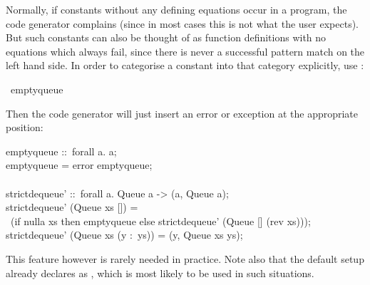 \begin{isabellebody}
\begin{isamarkuptext}
  Normally, if constants without any defining equations occur in
  a program, the code generator complains (since in most cases
  this is not what the user expects).  But such constants can also
  be thought of as function definitions with no equations which
  always fail, since there is never a successful pattern match
  on the left hand side.  In order to categorise a constant into
  that category explicitly, use \hyperlink{command.code-abort}{\mbox{}}:%
\end{isamarkuptext}%
\isamarkuptrue%
%
\isadelimquote
%
\endisadelimquote
%
\isatagquote
{}\isamarkupfalse%
\ empty{\isacharunderscore}queue%
\endisatagquote
{\isafoldquote}%
%
\isadelimquote
%
\endisadelimquote
%
\begin{isamarkuptext}%
\noindent Then the code generator will just insert an error or
  exception at the appropriate position:%
\end{isamarkuptext}%
\isamarkuptrue%
%
\isadelimquote
%
\endisadelimquote
%
\isatagquote
%
\begin{isamarkuptext}%
\isaverbatim%
\noindent%
\hspace*{0pt}empty{}queue ::~forall a. a;\\
\hspace*{0pt}empty{}queue = error {}empty{}queue{};\\
\hspace*{0pt}\\
\hspace*{0pt}strict{}dequeue' ::~forall a. Queue a -> (a, Queue a);\\
\hspace*{0pt}strict{}dequeue' (Queue xs []) =\\
\hspace*{0pt} ~(if nulla xs then empty{}queue else strict{}dequeue' (Queue [] (rev xs)));\\
\hspace*{0pt}strict{}dequeue' (Queue xs (y :~ys)) = (y, Queue xs ys);%
\end{isamarkuptext}%
\isamarkuptrue%
%
\endisatagquote
{\isafoldquote}%
%
\isadelimquote
%
\endisadelimquote
%
\begin{isamarkuptext}%
\noindent This feature however is rarely needed in practice.
  Note also that the  default setup already declares
   as \hyperlink{command.code-abort}{\mbox{}}, which is most
  likely to be used in such situations.%
\end{isamarkuptext}%
\isamarkuptrue%
%
\isadelimtheory
%
\endisadelimtheory
%
\isatagtheory
{}\isamarkupfalse%
%
\endisatagtheory
{\isafoldtheory}%
%
\isadelimtheory
%
\endisadelimtheory
\isanewline
\ \end{isabellebody}%
